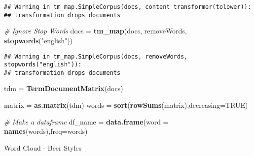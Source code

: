 \documentclass[]{article}
\newenvironment{Shaded}{\begin{snugshade}}{\end{snugshade}}
\newcommand{\CommentTok}[1]{\textcolor[rgb]{0.56,0.35,0.01}{\textit{#1}}}
\newcommand{\DataTypeTok}[1]{\textcolor[rgb]{0.13,0.29,0.53}{#1}}
\newcommand{\DecValTok}[1]{\textcolor[rgb]{0.00,0.00,0.81}{#1}}
\newcommand{\FloatTok}[1]{\textcolor[rgb]{0.00,0.00,0.81}{#1}}
\newcommand{\KeywordTok}[1]{\textcolor[rgb]{0.13,0.29,0.53}{\textbf{#1}}}
\newcommand{\NormalTok}[1]{#1}
\newcommand{\OperatorTok}[1]{\textcolor[rgb]{0.81,0.36,0.00}{\textbf{#1}}}
\newcommand{\OtherTok}[1]{\textcolor[rgb]{0.56,0.35,0.01}{#1}}
\newcommand{\StringTok}[1]{\textcolor[rgb]{0.31,0.60,0.02}{#1}}
\begin{document}
\begin{verbatim}
## Warning in tm_map.SimpleCorpus(docs, content_transformer(tolower)):
## transformation drops documents
\end{verbatim}

\begin{Shaded}
\begin{Highlighting}[]
\CommentTok{# Ignore Stop Words}
\NormalTok{docs =}\StringTok{ }\KeywordTok{tm_map}\NormalTok{(docs, removeWords, }\KeywordTok{stopwords}\NormalTok{(}\StringTok{"english"}\NormalTok{))}
\end{Highlighting}
\end{Shaded}

\begin{verbatim}
## Warning in tm_map.SimpleCorpus(docs, removeWords, stopwords("english")):
## transformation drops documents
\end{verbatim}

\begin{Shaded}
\begin{Highlighting}[]
\NormalTok{tdm =}\StringTok{ }\KeywordTok{TermDocumentMatrix}\NormalTok{(docs) }

\NormalTok{matrix =}\StringTok{ }\KeywordTok{as.matrix}\NormalTok{(tdm) }
\NormalTok{words =}\StringTok{ }\KeywordTok{sort}\NormalTok{(}\KeywordTok{rowSums}\NormalTok{(matrix),}\DataTypeTok{decreasing=}\OtherTok{TRUE}\NormalTok{) }

\CommentTok{# Make a dataframe}
\NormalTok{df_name =}\StringTok{ }\KeywordTok{data.frame}\NormalTok{(}\DataTypeTok{word =} \KeywordTok{names}\NormalTok{(words),}\DataTypeTok{freq=}\NormalTok{words)}
\end{Highlighting}
\end{Shaded}

Word Cloud - Beer Styles

\begin{Shaded}
\end{Shaded}
\end{document}
